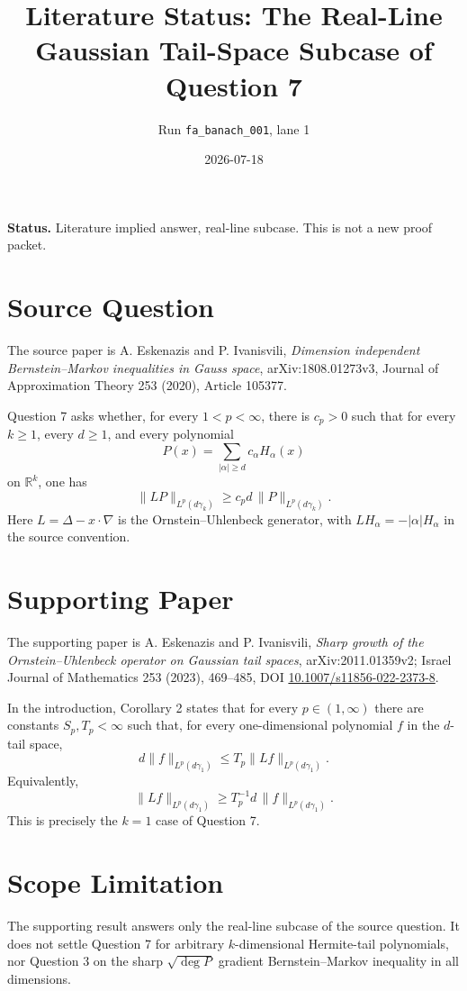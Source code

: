 \documentclass[11pt]{article}
\title{Literature Status: The Real-Line Gaussian Tail-Space Subcase of Question 7}
\author{Run \texttt{fa\_banach\_001}, lane 1}
\date{2026-07-18}
\begin{document}
\maketitle

\noindent\textbf{Status.} Literature implied answer, real-line subcase. This is not a new proof packet.

\section*{Source Question}

The source paper is A. Eskenazis and P. Ivanisvili, \emph{Dimension independent Bernstein--Markov inequalities in Gauss space}, arXiv:1808.01273v3, Journal of Approximation Theory 253 (2020), Article 105377.

Question 7 asks whether, for every \(1<p<\infty\), there is \(c_p>0\) such that for every \(k\ge1\), every \(d\ge1\), and every polynomial
\[
P(x)=\sum_{|\alpha|\ge d} c_\alpha H_\alpha(x)
\]
on \(\mathbb R^k\), one has
\[
\|LP\|_{L^p(d\gamma_k)}\ge c_p d\,\|P\|_{L^p(d\gamma_k)}.
\]
Here \(L=\Delta-x\cdot\nabla\) is the Ornstein--Uhlenbeck generator, with \(LH_\alpha=-|\alpha|H_\alpha\) in the source convention.

\section*{Supporting Paper}

The supporting paper is A. Eskenazis and P. Ivanisvili, \emph{Sharp growth of the Ornstein--Uhlenbeck operator on Gaussian tail spaces}, arXiv:2011.01359v2; Israel Journal of Mathematics 253 (2023), 469--485, DOI \href{https://doi.org/10.1007/s11856-022-2373-8}{10.1007/s11856-022-2373-8}.

In the introduction, Corollary 2 states that for every \(p\in(1,\infty)\) there are constants \(S_p,T_p<\infty\) such that, for every one-dimensional polynomial \(f\) in the \(d\)-tail space,
\[
d\|f\|_{L^p(d\gamma_1)}\le T_p\|Lf\|_{L^p(d\gamma_1)}.
\]
Equivalently,
\[
\|Lf\|_{L^p(d\gamma_1)}\ge T_p^{-1}d\,\|f\|_{L^p(d\gamma_1)}.
\]
This is precisely the \(k=1\) case of Question 7.

\section*{Scope Limitation}

The supporting result answers only the real-line subcase of the source question. It does not settle Question 7 for arbitrary \(k\)-dimensional Hermite-tail polynomials, nor Question 3 on the sharp \(\sqrt{\deg P}\) gradient Bernstein--Markov inequality in all dimensions.
\end{document}
